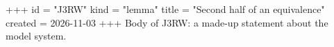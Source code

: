 +++
id = "J3RW"
kind = "lemma"
title = "Second half of an equivalence"
created = 2026-11-03
+++
Body of J3RW: a made-up statement about the model system.
